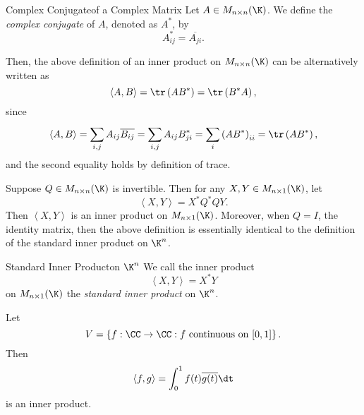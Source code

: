 \documentclass[linearalgebra]{subfiles}
\begin{document}
    \begin{definition}{Complex Conjugate}{of a Complex Matrix}
        Let $A\in M_{n\times n}(\K)$. We define the \emph{complex conjugate} of $A$, denoted as $A^*$, by
        \begin{equation*}
            A^*_{ij} = \overline{A_{ji}}.
        \end{equation*}
    \end{definition}

    \noindent Then, the above definition of an inner product on $M_{n\times n}(\K)$ can be alternatively written as 
    \begin{equation*}
        \left\langle A, B\right\rangle = \tr\left( AB^* \right) = \tr\left( B^*A \right) ,
    \end{equation*}
    since
    \begin{equation*}
        \left\langle A, B\right\rangle = \sum^{}_{i,j} A_{ij}\overline{B_{ij}} = \sum^{}_{i,j} A_{ij}B^*_{ji} = \sum^{}_{i} \left( AB^* \right) _{ii} = \tr\left( AB^* \right),
    \end{equation*}
    and the second equality holds by definition of trace.

    \begin{remark}
        Suppose $Q\in M_{n\times n}(\K)$ is invertible. Then for any $X,Y\in M_{n\times 1}(\K)$, let
        \begin{equation*}
            \left\langle X, Y\right\rangle = X^*Q^*QY. 
        \end{equation*}
        Then $\left\langle X, Y\right\rangle $ is an inner product on $M_{n\times 1}(\K)$. Moreover, when $Q=I$, the identity matrix, then the above definition is essentially identical to the definition of the standard inner product on $\K^n$.
    \end{remark}

    \begin{definition}{Standard Inner Product}{on $\K^n$}
        We call the inner product
        \begin{equation*}
            \left\langle X, Y\right\rangle = X^*Y
        \end{equation*}
        on $M_{n\times 1}(\K)$ the \emph{standard inner product} on $\K^n$. 
    \end{definition}

    \begin{example}
        Let
        \begin{equation*}
            V = \left\lbrace f:\CC\to\CC: f\text{ continuous on }[0,1] \right\rbrace .
        \end{equation*}
        Then
        \begin{equation*}
            \left\langle f, g\right\rangle = \int^{1}_{0} f(t)\overline{g(t)}\dt
        \end{equation*}
        is an inner product.
    \end{example}
\end{document}

